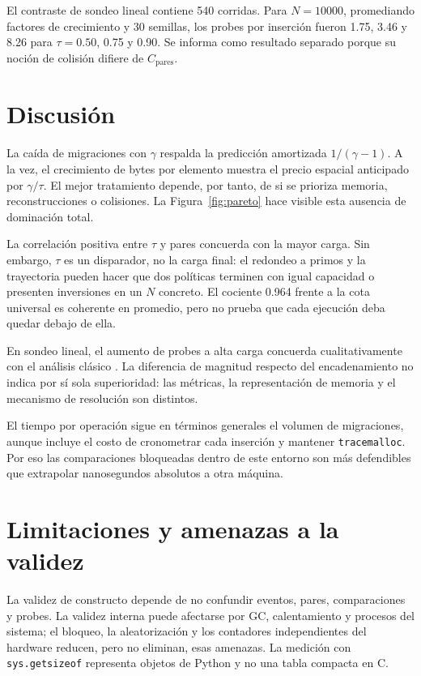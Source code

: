 \documentclass[11pt]{article}
\begin{document}
El contraste de sondeo lineal contiene 540 corridas. Para $N=10000$, promediando factores de crecimiento y 30 semillas, los probes por inserción fueron 1.75, 3.46 y 8.26 para $\tau=0.50$, 0.75 y 0.90. Se informa como resultado separado porque su noción de colisión difiere de $C_{\mathrm{pares}}$.

\section{Discusión}
La caída de migraciones con $\gamma$ respalda la predicción amortizada $1/(\gamma-1)$. A la vez, el crecimiento de bytes por elemento muestra el precio espacial anticipado por $\gamma/\tau$. El mejor tratamiento depende, por tanto, de si se prioriza memoria, reconstrucciones o colisiones. La Figura~\ref{fig:pareto} hace visible esta ausencia de dominación total.

La correlación positiva entre $\tau$ y pares concuerda con la mayor carga. Sin embargo, $\tau$ es un disparador, no la carga final: el redondeo a primos y la trayectoria pueden hacer que dos políticas terminen con igual capacidad o presenten inversiones en un $N$ concreto. El cociente 0.964 frente a la cota universal es coherente en promedio, pero no prueba que cada ejecución deba quedar debajo de ella.

En sondeo lineal, el aumento de probes a alta carga concuerda cualitativamente con el análisis clásico \cite{FlajoletPobleteViola1998}. La diferencia de magnitud respecto del encadenamiento no indica por sí sola superioridad: las métricas, la representación de memoria y el mecanismo de resolución son distintos.

El tiempo por operación sigue en términos generales el volumen de migraciones, aunque incluye el costo de cronometrar cada inserción y mantener \texttt{tracemalloc}. Por eso las comparaciones bloqueadas dentro de este entorno son más defendibles que extrapolar nanosegundos absolutos a otra máquina.

\section{Limitaciones y amenazas a la validez}
La validez de constructo depende de no confundir eventos, pares, comparaciones y probes. La validez interna puede afectarse por GC, calentamiento y procesos del sistema; el bloqueo, la aleatorización y los contadores independientes del hardware reducen, pero no eliminan, esas amenazas. La medición con \texttt{sys.getsizeof} representa objetos de Python y no una tabla compacta en C.
\end{document}
